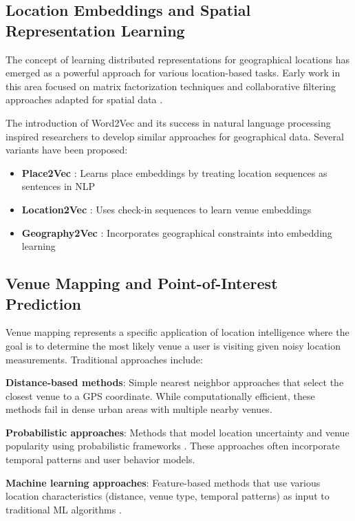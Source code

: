 \subsection{Location Embeddings and Spatial Representation Learning}

The concept of learning distributed representations for geographical locations has emerged as a powerful approach for various location-based tasks. Early work in this area focused on matrix factorization techniques and collaborative filtering approaches adapted for spatial data \cite{zheng2010collaborative}.

The introduction of Word2Vec \cite{mikolov2013word2vec} and its success in natural language processing inspired researchers to develop similar approaches for geographical data. Several variants have been proposed:

\begin{itemize}
    \item \textbf{Place2Vec} \cite{yan2017place2vec}: Learns place embeddings by treating location sequences as sentences in NLP
    \item \textbf{Location2Vec} \cite{liu2017location2vec}: Uses check-in sequences to learn venue embeddings
    \item \textbf{Geography2Vec} \cite{zhang2018geography2vec}: Incorporates geographical constraints into embedding learning
\end{itemize}

\subsection{Venue Mapping and Point-of-Interest Prediction}

Venue mapping represents a specific application of location intelligence where the goal is to determine the most likely venue a user is visiting given noisy location measurements. Traditional approaches include:

\textbf{Distance-based methods}: Simple nearest neighbor approaches that select the closest venue to a GPS coordinate. While computationally efficient, these methods fail in dense urban areas with multiple nearby venues.

\textbf{Probabilistic approaches}: Methods that model location uncertainty and venue popularity using probabilistic frameworks \cite{krumm2008predicting}. These approaches often incorporate temporal patterns and user behavior models.

\textbf{Machine learning approaches}: Feature-based methods that use various location characteristics (distance, venue type, temporal patterns) as input to traditional ML algorithms \cite{lian2014geomf}.

